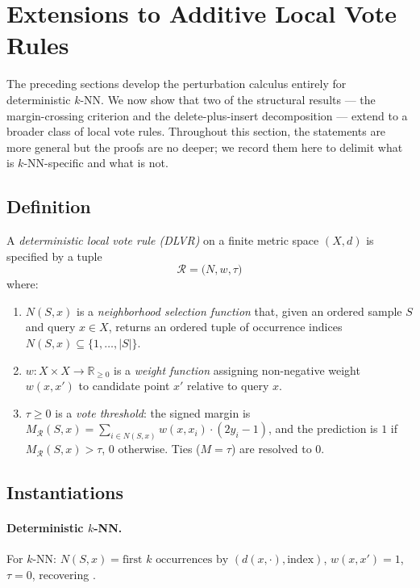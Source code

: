 \section[Extensions to Additive Local Vote Rules]{Extensions to Additive Local Vote Rules}
\label{sec:local-vote-framework}

The preceding sections develop the perturbation calculus entirely for
deterministic $k$-NN. We now show that two of the structural results --- the
margin-crossing criterion and the delete-plus-insert decomposition --- extend
to a broader class of local vote rules. Throughout this section, the
statements are more general but the proofs are no deeper; we record them here
to delimit what is $k$-NN-specific and what is not.

\subsection{Definition}

\begin{definition}
\label{def:dlvr}
A {\em deterministic local vote rule (DLVR)} on a finite metric space $(X, d)$
is specified by a tuple
\[
\mathcal{R} = \big(N, w, \tau\big)
\]
where:
\begin{enumerate}[leftmargin=*,label=(\arabic*)]
  \item $N(S, x)$ is a {\em neighborhood selection function} that, given an
    ordered sample $S$ and query $x \in X$, returns an ordered tuple of
    occurrence indices $N(S,x) \subseteq \{1,\ldots,|S|\}$.
  \item $w : X \times X \to \mathbb{R}_{\ge 0}$ is a {\em weight function}
    assigning non-negative weight $w(x, x')$ to candidate point $x'$
    relative to query $x$.
  \item $\tau \ge 0$ is a {\em vote threshold}: the signed margin is
    $M_{\mathcal{R}}(S,x) = \sum_{i \in N(S,x)} w(x, x_i) \cdot (2y_i - 1)$,
    and the prediction is $1$ if $M_{\mathcal{R}}(S,x) > \tau$, $0$ otherwise.
    Ties ($M = \tau$) are resolved to $0$.
\end{enumerate}
\end{definition}

\subsection{Instantiations}

\paragraph{Deterministic $k$-NN.}
For $k$-NN:
$N(S,x) = \text{first } k \text{ occurrences by } (d(x,\cdot), \text{index})$,
$w(x,x') = 1$, $\tau = 0$,
recovering .

